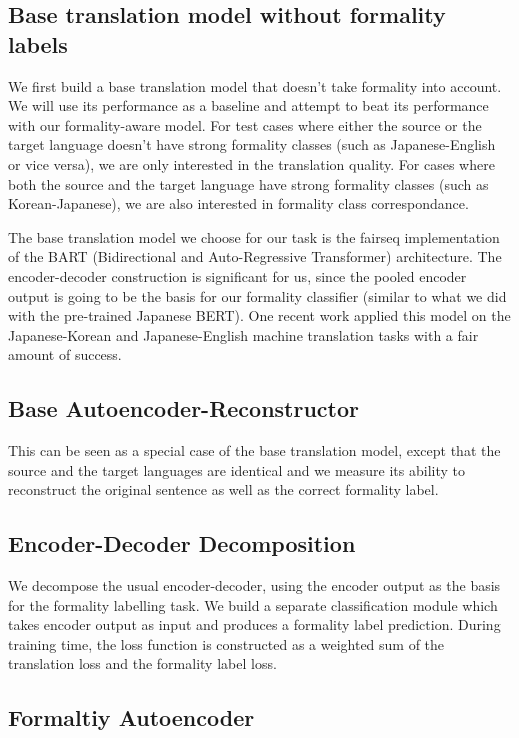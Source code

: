 \documentclass[11pt]{article}
\begin{document}
\subsection{Base translation model without formality labels}

We first build a base translation model that doesn't take formality into account. We will use its performance as a baseline and attempt to beat its performance with our formality-aware model. For test cases where either the source or the target language doesn't have strong formality classes (such as Japanese-English or vice versa), we are only interested in the translation quality. For cases where both the source and the target language have strong formality classes (such as Korean-Japanese), we are also interested in formality class correspondance.

The base translation model we choose for our task is the fairseq implementation of the BART (Bidirectional and Auto-Regressive Transformer) architecture. The encoder-decoder construction is significant for us, since the pooled encoder output is going to be the basis for our formality classifier (similar to what we did with the pre-trained Japanese BERT). One recent work \cite{BART:21} applied this model on the Japanese-Korean and Japanese-English machine translation tasks with a fair amount of success. 

\subsection{Base Autoencoder-Reconstructor}

This can be seen as a special case of the base translation model, except that the source and the target languages are identical and we measure its ability to reconstruct the original sentence as well as the correct formality label.

\subsection{Encoder-Decoder Decomposition}

We decompose the usual encoder-decoder, using the encoder output as the basis for the formality labelling task. We build a separate classification module which takes encoder output as input and produces a formality label prediction. During training time, the loss function is constructed as a weighted sum of the translation loss and the formality label loss.

\subsection{Formaltiy Autoencoder}
\end{document}
